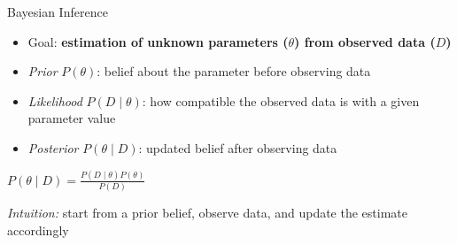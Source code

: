 \documentclass[aspectratio=169]{beamer}
\begin{document}
\begin{frame}{Bayesian Inference}
\begin{itemize}
    \item Goal: \textbf{estimation of unknown parameters ($\theta$) from observed data ($D$)}
    \item \textit{Prior} $P(\theta)$: belief about the parameter before observing data
    \item \textit{Likelihood} $P(D \mid \theta)$: how compatible the observed data is with a given parameter value
    \item \textit{Posterior} $P(\theta \mid D)$: updated belief after observing data
\end{itemize}

\vspace{0.5cm}

\begin{center}
$P(\theta \mid D) = \frac{P(D \mid \theta) P(\theta)}{P(D)}$
\end{center}

\vspace{0.5cm}

\textit{Intuition:} start from a prior belief, observe data, and update the estimate accordingly
\end{frame}

\end{document}
